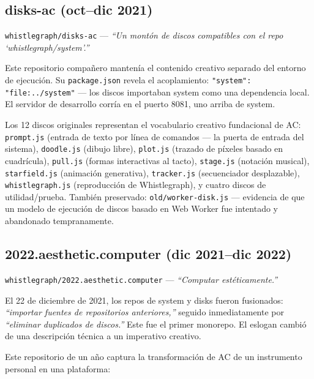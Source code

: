 \documentclass[10pt,letterpaper,twocolumn]{article}
\begin{document}
\subsection{disks-ac (oct--dic 2021)}

\texttt{whistlegraph/disks-ac} --- \emph{``Un montón de discos compatibles con el repo `whistlegraph/system'.''}

Este repositorio compañero mantenía el contenido creativo separado del entorno de ejecución. Su \texttt{package.json} revela el acoplamiento: \texttt{"system": "file:../system"} --- los discos importaban system como una dependencia local. El servidor de desarrollo corría en el puerto 8081, uno arriba de system.

Los 12 discos originales representan el vocabulario creativo fundacional de AC: \texttt{prompt.js} (entrada de texto por línea de comandos --- la puerta de entrada del sistema), \texttt{doodle.js} (dibujo libre), \texttt{plot.js} (trazado de píxeles basado en cuadrícula), \texttt{pull.js} (formas interactivas al tacto), \texttt{stage.js} (notación musical), \texttt{starfield.js} (animación generativa), \texttt{tracker.js} (secuenciador desplazable), \texttt{whistlegraph.js} (reproducción de Whistlegraph), y cuatro discos de utilidad/prueba. También preservado: \texttt{old/worker-disk.js} --- evidencia de que un modelo de ejecución de discos basado en Web Worker fue intentado y abandonado tempranamente.

\subsection{2022.aesthetic.computer (dic 2021--dic 2022)}

\texttt{whistlegraph/2022.aesthetic.computer} --- \emph{``Computar estéticamente.''}

El 22 de diciembre de 2021, los repos de system y disks fueron fusionados: \emph{``importar fuentes de repositorios anteriores,''} seguido inmediatamente por \emph{``eliminar duplicados de discos.''} Este fue el primer monorepo. El eslogan cambió de una descripción técnica a un imperativo creativo.

Este repositorio de un año captura la transformación de AC de un instrumento personal en una plataforma:
\end{document}
